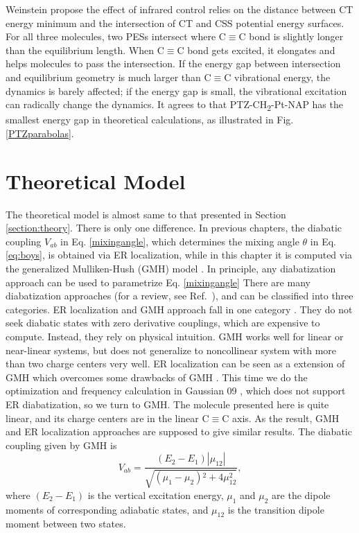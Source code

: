 Weinstein propose the effect of infrared control relies on the distance between CT energy minimum and the intersection of CT and CSS potential energy surfaces. For all three molecules, two PESs intersect where C$\equiv$C bond is slightly longer than the equilibrium length. When C$\equiv$C bond gets excited, it elongates and helps molecules to pass the intersection. If the energy gap between intersection and equilibrium geometry is much larger than C$\equiv$C vibrational energy, the dynamics is barely affected; if the energy gap is small, the vibrational excitation can radically change the dynamics. It agrees to that PTZ-CH\textsubscript{2}-Pt-NAP has the smallest energy gap in theoretical calculations, as illustrated in Fig. \ref{PTZparabolas}.


\section{Theoretical Model} %
The theoretical model is almost same to that presented in Section \ref{section:theory}. There is only one difference. In previous chapters, the diabatic coupling $V_{ab}$ in Eq. \ref{mixingangle}, which determines the mixing angle $\theta$ in Eq. \ref{eq:boys}, is obtained via ER localization, while in this chapter it is computed via the generalized Mulliken-Hush (GMH) model \cite{cave1996generalization,cave1997calculation}. In principle, any diabatization approach can be used to parametrize Eq. \ref{mixingangle} There are many diabatization approaches (for a review, see Ref.~\cite{domcke2004conical}), and can be classified into three categories. ER localization and GMH approach fall in one category \cite{subotnik2008constructing,subotnik2009initial}. They do not seek diabatic states with zero derivative couplings, which are expensive to compute. Instead, they rely on physical intuition. GMH works well for linear or near-linear systems, but does not generalize to noncollinear system with more than two charge centers very well. ER localization can be seen as a extension of GMH which overcomes some drawbacks of GMH \cite{subotnik2009initial}. This time we do the optimization and frequency calculation in Gaussian 09 \cite{g09}, which does not support ER diabatization, so we turn to GMH. The molecule presented here is quite linear, and its charge centers are in the linear C$\equiv$C axis. As the result, GMH and ER localization approaches are supposed to give similar results. The diabatic coupling given by GMH is
$$V_{ab}=\frac{\left(E_2-E_1\right) \left|\mu _{12}\right|}{\sqrt{\left(\mu _1-\mu _2\right){}^2+4 \mu _{12}^2}},$$
where $\left(E_2-E_1\right)$ is the vertical excitation energy, $\mu _1$ and $\mu _2$ are the dipole moments of corresponding adiabatic states, and $\mu _{12}$ is the transition dipole moment between two states.

